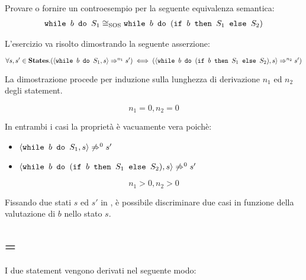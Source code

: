 
{Provare o fornire un controesempio per la seguente equivalenza semantica:
\begin{align*}
\wbS{b}{S_1} \eqSOS \wbS{b}{(\ifABC{b}{S_1}{S_2})}
\end{align*}}
{}

L'esercizio va risolto dimostrando la seguente asserzione:

$\forall{s,s'} \in \states.
  (\confSs{\wbS{b}{S_1}}{s} \Rar{n_1} s')
  \iff
  (\confSs{\wbS{b}{(\ifABC{b}{S_1}{S_2})}}{s} \Rar{n_2} s')
$

La dimostrazione procede per induzione sulla lunghezza di derivazione $n_1$ ed
$n_2$ degli statement.

$$
\boxed{n_1 = 0, n_2 = 0}
$$

In entrambi i casi la proprietà è vacuamente vera poichè:
\begin{itemize}
  \item $\confSs{\wbS{b}{S_1}}{s} \not\Rar{0} s'$
  \item $\confSs{\wbS{b}{(\ifABC{b}{S_1}{S_2})}}{s} \not\Rar{0} s'$
\end{itemize}

$$
\boxed{n_1 > 0, n_2 > 0}
$$

Fissando due stati $s$ ed $s'$ in \states, è possibile discriminare due
casi in funzione della valutazione di $b$ nello stato $s$.

\subsection{ = \semfalse}
I due statement vengono derivati nel seguente modo:

